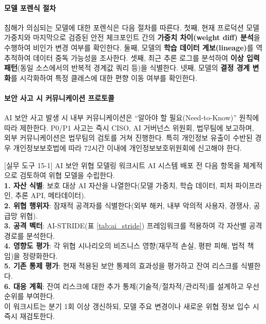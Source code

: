\paragraph{모델 포렌식 절차}

침해가 의심되는 모델에 대한 포렌식은 다음 절차를 따른다. 첫째, 현재 프로덕션 모델 가중치와 마지막으로 검증된 안전 체크포인트 간의 \textbf{가중치 차이(weight diff) 분석}을 수행하여 비인가 변경 여부를 확인한다. 둘째, 모델의 \textbf{학습 데이터 계보(lineage)}를 역추적하여 데이터 중독 가능성을 조사한다. 셋째, 최근 추론 로그를 분석하여 \textbf{이상 입력 패턴}(동일 소스에서의 반복적 경계값 쿼리 등)을 식별한다. 넷째, 모델의 \textbf{결정 경계 변화}를 시각화하여 특정 클래스에 대한 편향 이동 여부를 확인한다.

\paragraph{보안 사고 시 커뮤니케이션 프로토콜}

AI 보안 사고 발생 시 내부 커뮤니케이션은 ``알아야 할 필요(Need-to-Know)'' 원칙에 따라 제한한다. P0/P1 사고는 즉시 CISO, AI 거버넌스 위원회, 법무팀에 보고하며, 외부 커뮤니케이션은 법무팀의 검토를 거쳐 진행한다. 특히 개인정보 유출이 수반된 경우 개인정보보호법에 따라 72시간 이내에 개인정보보호위원회에 신고해야 한다.

\begin{practicaltool}{[실무 도구 15-1] AI 보안 위협 모델링 워크시트}
AI 시스템 배포 전 다음 항목을 체계적으로 검토하여 위협 모델을 수립한다.\\[0.3em]
\textbf{1. 자산 식별}: 보호 대상 AI 자산을 나열한다(모델 가중치, 학습 데이터, 피처 파이프라인, 추론 API, 메타데이터).\\
\textbf{2. 위협 행위자}: 잠재적 공격자를 식별한다(외부 해커, 내부 악의적 사용자, 경쟁사, 공급망 위협).\\
\textbf{3. 공격 벡터}: AI-STRIDE(표 \ref{tab:ai_stride}) 프레임워크를 적용하여 각 자산별 공격 경로를 분석한다.\\
\textbf{4. 영향도 평가}: 각 위협 시나리오의 비즈니스 영향(재무적 손실, 평판 피해, 법적 책임)을 정량화한다.\\
\textbf{5. 기존 통제 평가}: 현재 적용된 보안 통제의 효과성을 평가하고 잔여 리스크를 식별한다.\\
\textbf{6. 대응 계획}: 잔여 리스크에 대한 추가 통제(기술적/절차적/관리적)를 설계하고 우선순위를 부여한다.\\[0.3em]
이 워크시트는 분기 1회 이상 갱신하되, 모델 주요 변경이나 새로운 위협 정보 입수 시 즉시 재검토한다.
\end{practicaltool}

